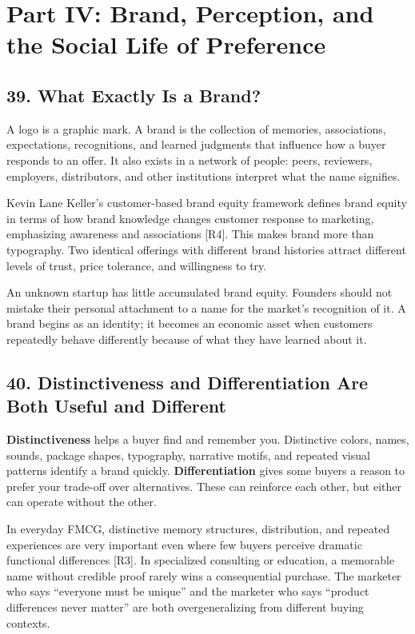 \section*{Part IV: Brand, Perception, and the Social Life of Preference}

\subsection*{39. What Exactly Is a Brand?}

A logo is a graphic mark. A brand is the collection of memories, associations, expectations, recognitions, and learned judgments that influence how a buyer responds to an offer. It also exists in a network of people: peers, reviewers, employers, distributors, and other institutions interpret what the name signifies.

Kevin Lane Keller's customer-based brand equity framework defines brand equity in terms of how brand knowledge changes customer response to marketing, emphasizing awareness and associations [R4]. This makes brand more than typography. Two identical offerings with different brand histories attract different levels of trust, price tolerance, and willingness to try.

An unknown startup has little accumulated brand equity. Founders should not mistake their personal attachment to a name for the market's recognition of it. A brand begins as an identity; it becomes an economic asset when customers repeatedly behave differently because of what they have learned about it.

\subsection*{40. Distinctiveness and Differentiation Are Both Useful and Different}

\textbf{Distinctiveness} helps a buyer find and remember you. Distinctive colors, names, sounds, package shapes, typography, narrative motifs, and repeated visual patterns identify a brand quickly. \textbf{Differentiation} gives some buyers a reason to prefer your trade-off over alternatives. These can reinforce each other, but either can operate without the other.

In everyday FMCG, distinctive memory structures, distribution, and repeated experiences are very important even where few buyers perceive dramatic functional differences [R3]. In specialized consulting or education, a memorable name without credible proof rarely wins a consequential purchase. The marketer who says ``everyone must be unique'' and the marketer who says ``product differences never matter'' are both overgeneralizing from different buying contexts.

